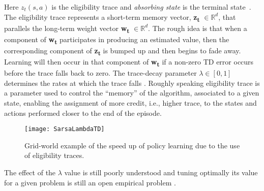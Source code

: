 Here $z_t(s, a)$  is the eligibility trace and \textit{absorbing state} is the terminal state~\cite{Sigaud:2010:MDP:1841781}. The eligibility trace represents a short-term memory vector, \textbf{z\textsubscript{t}} $\in \mathbb{R}^d$, that parallels the long-term weight vector \textbf{w\textsubscript{t}} $\in \mathbb{R}^d$. The rough idea is that when a component of \textbf{w\textsubscript{t}} participates in producing an estimated value, then the  corresponding component of \textbf{z\textsubscript{t}} is bumped up and then begins to fade away. Learning will then occur in that component of \textbf{w\textsubscript{t}} if a non-zero TD error occurs before the trace falls back to zero. The trace-decay parameter $\lambda \in [0, 1]$ determines the rates at which the trace falls \cite{SuttonBarto}. Roughly speaking eligibility trace is a parameter used to control the “memory” of the algorithm, associated to a given state, enabling the assignment of more credit, i.e., higher trace, to the states and actions performed closer to the end of the episode.

\begin{figure}[h!]
	\centering
	\texttt{[image: SarsaLambdaTD]}
	\caption{Grid-world example of the speed up of policy learning due to the use of eligibility traces.}
	\label{fig:SarsaLambdaTD}
\end{figure}

The effect of the $\lambda$ value is still poorly understood and tuning optimally its value for a given problem is still an open empirical problem \cite{Sigaud:2010:MDP:1841781}.


